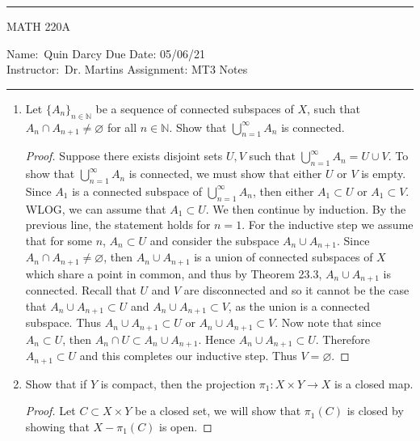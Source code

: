 \documentclass[12pt]{article}
\theoremstyle{definition}
\begin{document}
    \thispagestyle{empty}\hrule

    \begin{center}
        \vspace{.4cm} { \large MATH 220A}
    \end{center}
    {Name:\ Quin Darcy \hspace{\fill} Due Date: 05/06/21 \\
    { Instructor:}\ Dr. Martins \hspace{\fill} Assignment:
    MT3 Notes \\ \hrule}

    \begin{enumerate}
        \item Let $\{A_n\}_{n\in\mathbb{N}}$ be a sequence of connected subspaces of $X$, such that $A_n\cap A_{n+1}\neq \varnothing$ for all $n\in\mathbb{N}$. Show that $\bigcup_{n=1}^{\infty}A_n$ is connected.
            \begin{proof}
                Suppose there exists disjoint sets $U, V$ such that $\bigcup_{n=1}^{\infty}A_n=U\cup V$. To show that $\bigcup_{n=1}^{\infty}A_n$ is connected, we must show that either $U$ or $V$ is empty. Since $A_1$ is a connected subspace of $\bigcup_{n=1}^{\infty}A_n$, then either $A_1\subset U$ or $A_1\subset V$. WLOG, we can assume that $A_1\subset U$. We then continue by induction. By the previous line, the statement holds for $n=1$. For the inductive step we assume that for some $n$, $A_n\subset U$ and consider the subspace $A_n\cup A_{n+1}$. Since $A_n\cap A_{n+1}\neq\varnothing$, then $A_n\cup A_{n+1}$ is a union of connected subspaces of $X$ which share a point in common, and thus by Theorem 23.3, $A_n\cup A_{n+1}$ is connected. Recall that $U$ and $V$ are disconnected and so it cannot be the case that $A_n\cup A_{n+1}\subset U$ and $A_n\cup A_{n+1}\subset V$, as the union is a connected subspace. Thus $A_n\cup A_{n+1}\subset U$ or $A_n\cup A_{n+1}\subset V$. Now note that since $A_n\subset U$, then $A_n\cap U\subset A_n\cup A_{n+1}$. Hence $A_n\cup A_{n+1}\subset U$. Therefore $A_{n+1}\subset U$ and this completes our inductive step. Thus $V=\varnothing$. 
            \end{proof}
        \item Show that if $Y$ is compact, then the projection $\pi_1:X\times Y\to X$ is a closed map.
            \begin{proof}
                Let $C\subset X\times Y$ be a closed set, we will show that $\pi_1(C)$ is closed by showing that $X-\pi_1(C)$ is open.
            \end{proof}
    \end{enumerate}
\end{document}
